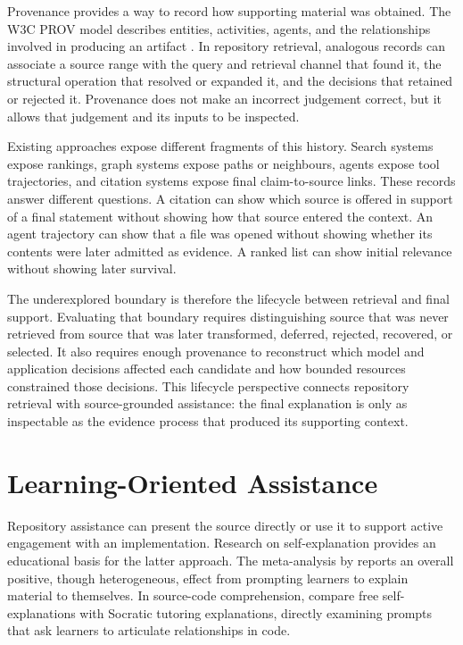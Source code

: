 Provenance provides a way to record how supporting material was obtained. The W3C PROV model describes entities, activities, agents, and the relationships involved in producing an artifact \textcite{W3C2013PROV}. In repository retrieval, analogous records can associate a source range with the query and retrieval channel that found it, the structural operation that resolved or expanded it, and the decisions that retained or rejected it. Provenance does not make an incorrect judgement correct, but it allows that judgement and its inputs to be inspected.

Existing approaches expose different fragments of this history. Search systems expose rankings, graph systems expose paths or neighbours, agents expose tool trajectories, and citation systems expose final claim-to-source links. These records answer different questions. A citation can show which source is offered in support of a final statement without showing how that source entered the context. An agent trajectory can show that a file was opened without showing whether its contents were later admitted as evidence. A ranked list can show initial relevance without showing later survival.

The underexplored boundary is therefore the lifecycle between retrieval and final support. Evaluating that boundary requires distinguishing source that was never retrieved from source that was later transformed, deferred, rejected, recovered, or selected. It also requires enough provenance to reconstruct which model and application decisions affected each candidate and how bounded resources constrained those decisions. This lifecycle perspective connects repository retrieval with source-grounded assistance: the final explanation is only as inspectable as the evidence process that produced its supporting context.

\section{Learning-Oriented Assistance}\label{sec:learning-oriented-assistance}

Repository assistance can present the source directly or use it to support active engagement with an implementation. Research on self-explanation provides an educational basis for the latter approach. The meta-analysis by \textcite{Bisra2018SelfExplanation} reports an overall positive, though heterogeneous, effect from prompting learners to explain material to themselves. In source-code comprehension, \textcite{Tamang2021Socratic} compare free self-explanations with Socratic tutoring explanations, directly examining prompts that ask learners to articulate relationships in code.

